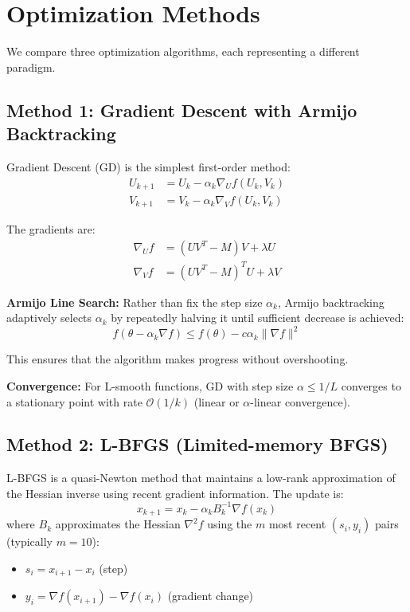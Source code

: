 \documentclass[11pt,a4paper]{article}
\begin{document}
\section{Optimization Methods}

We compare three optimization algorithms, each representing a different paradigm.

\subsection{Method 1: Gradient Descent with Armijo Backtracking}

Gradient Descent (GD) is the simplest first-order method:
\begin{align}
U_{k+1} &= U_k - \alpha_k \nabla_U f(U_k, V_k) \\
V_{k+1} &= V_k - \alpha_k \nabla_V f(U_k, V_k)
\end{align}

The gradients are:
\begin{align}
\nabla_U f &= (UV^T - M)V + \lambda U \\
\nabla_V f &= (UV^T - M)^T U + \lambda V
\end{align}

\textbf{Armijo Line Search:} Rather than fix the step size $\alpha_k$, Armijo backtracking adaptively selects $\alpha_k$ by repeatedly halving it until sufficient decrease is achieved:
\[
f(\theta - \alpha_k \nabla f) \leq f(\theta) - c \alpha_k \|\nabla f\|^2
\]

This ensures that the algorithm makes progress without overshooting.

\textbf{Convergence:} For L-smooth functions, GD with step size $\alpha \leq 1/L$ converges to a stationary point with rate $\mathcal{O}(1/k)$ (linear or $\alpha$-linear convergence).

\subsection{Method 2: L-BFGS (Limited-memory BFGS)}

L-BFGS is a quasi-Newton method that maintains a low-rank approximation of the Hessian inverse using recent gradient information. The update is:
\[
x_{k+1} = x_k - \alpha_k B_k^{-1} \nabla f(x_k)
\]
where $B_k$ approximates the Hessian $\nabla^2 f$ using the $m$ most recent $(s_i, y_i)$ pairs (typically $m = 10$):
\begin{itemize}
  \item $s_i = x_{i+1} - x_i$ (step)
  \item $y_i = \nabla f(x_{i+1}) - \nabla f(x_i)$ (gradient change)
\end{itemize}
\end{document}
